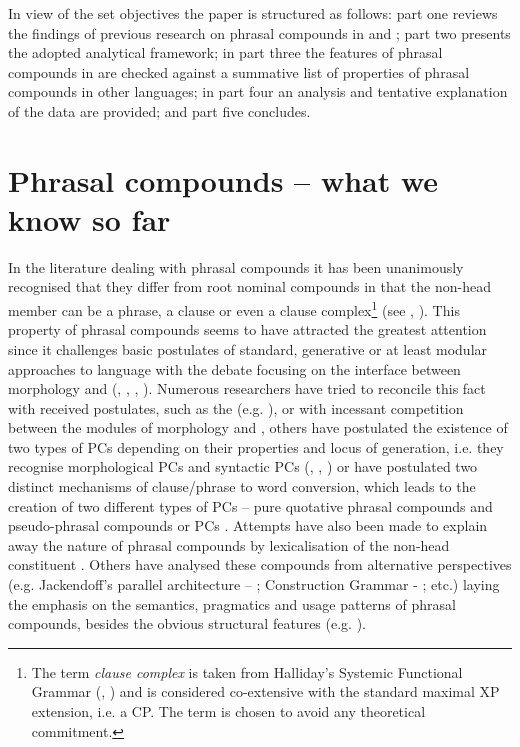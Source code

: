\documentclass[output=paper]{LSP/langsci}
\begin{document}
In view of the set objectives the paper is structured as follows: part one reviews the findings of previous research on phrasal compounds in  and ; part two presents the adopted analytical framework; in part three the features of phrasal compounds in  are checked against a summative list of properties of phrasal compounds in other languages; in part four an analysis and tentative explanation of the data are provided; and part five concludes.

\section{Phrasal compounds – what we know so far}\label{sec:bagasheva:2}

In the literature dealing with phrasal compounds it has been unanimously recognised that they differ from root nominal compounds in that the non-head member can be a phrase, a clause or even a clause complex\footnote{The term \textit{clause complex} is taken from Halliday’s Systemic Functional Grammar (\citealt{Halliday1994},  \citealt{Halliday2014}) and is considered co-extensive with the standard maximal XP extension, i.e. a CP. The term is chosen to avoid any theoretical commitment.} (see \citealt{Trips2012}, \citeyear{Trips2016}). This property of phrasal compounds seems to have attracted the greatest attention since it challenges basic postulates of standard, generative or at least modular approaches to language with the debate focusing on the interface between morphology and  (\citealt{BagriacikRalli2015}, \citealt{Botha1981}, \citealt{Lieber1988}, \citealt{Ralli2013locus,Ralli2013moderngreek}). Numerous researchers have tried to reconcile this fact with received postulates, such as the   (e.g.  \citealt{Lieber2006}), or with incessant competition between the modules of morphology and   \citep{AckemaNeeleman2004}, others have postulated the existence of two types of PCs depending on their properties and locus of generation, i.e. they recognise morphological PCs and syntactic PCs (\citealt{BagriacikRalli2015}, \citealt{Botha1981}, \citealt{Lieber1988}) or have postulated two distinct mechanisms of clause\slash phrase to word conversion, which leads to the creation of two different types of PCs – pure quotative phrasal compounds and pseudo-phrasal compounds or  PCs \citep{Pafel2015}. Attempts have also been made to explain away the nature of phrasal compounds by lexicalisation of the non-head constituent  \citep{BresnanMchombo1995}.   Others have analysed these compounds from alternative perspectives (e.g. Jackendoff’s parallel architecture – \citealt{Trips2012,Trips2016}; Construction Grammar - \citealt{Hein2015}; etc.) laying the emphasis on the semantics, pragmatics and usage patterns of phrasal compounds, besides the obvious structural features (e.g. \citealt{Meibauer2007,Meibauer2015}). 
\end{document}
